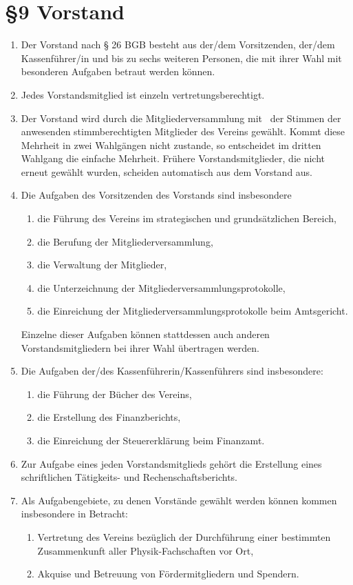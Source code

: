 \documentclass[ngerman]{article}
\begin{document}
\section*{§9 Vorstand}
\begin{enumerate}
 \item Der Vorstand nach § 26 BGB besteht aus der/dem Vorsitzenden, der/dem Kassenführer/in und bis zu sechs weiteren Personen, die mit ihrer Wahl mit besonderen Aufgaben betraut werden können.
 \item Jedes Vorstandsmitglied ist einzeln vertretungsberechtigt.
 \item Der Vorstand wird durch die Mitgliederversammlung mit \ der Stimmen der anwesenden stimmberechtigten Mitglieder des Vereins gewählt.
       Kommt diese Mehrheit in zwei Wahlgängen nicht zustande, so entscheidet im dritten Wahlgang die einfache Mehrheit.
       Frühere Vorstandsmitglieder, die nicht erneut gewählt wurden, scheiden automatisch aus dem Vorstand aus.
 \item Die Aufgaben des Vorsitzenden des Vorstands sind insbesondere
  \begin{enumerate}
   \item die Führung des Vereins im strategischen und grundsätzlichen Bereich,
   \item die Berufung der Mitgliederversammlung,
   \item die Verwaltung der Mitglieder,
   \item die Unterzeichnung der Mitgliederversammlungsprotokolle,
   \item die Einreichung der Mitgliederversammlungsprotokolle beim Amtsgericht.
  \end{enumerate}
  Einzelne dieser Aufgaben können stattdessen auch anderen Vorstandsmitgliedern bei ihrer Wahl übertragen werden.

 \item Die Aufgaben der/des Kassenführerin/Kassenführers sind insbesondere:
  \begin{enumerate}
   \item die Führung der Bücher des Vereins,
   \item die Erstellung des Finanzberichts,
   \item die Einreichung der Steuererklärung beim Finanzamt.
  \end{enumerate}

 \item Zur Aufgabe eines jeden Vorstandsmitglieds gehört die Erstellung eines schriftlichen Tätigkeits- und Rechenschaftsberichts.

  \item Als Aufgabengebiete, zu denen Vorstände gewählt werden können kommen insbesondere in Betracht:
  \begin{enumerate}
   \item Vertretung des Vereins bezüglich der Durchführung einer bestimmten Zusammenkunft aller Physik-Fachschaften vor Ort,
   \item Akquise und Betreuung von Fördermitgliedern und Spendern.
  \end{enumerate}
\end{enumerate}
\end{document}
